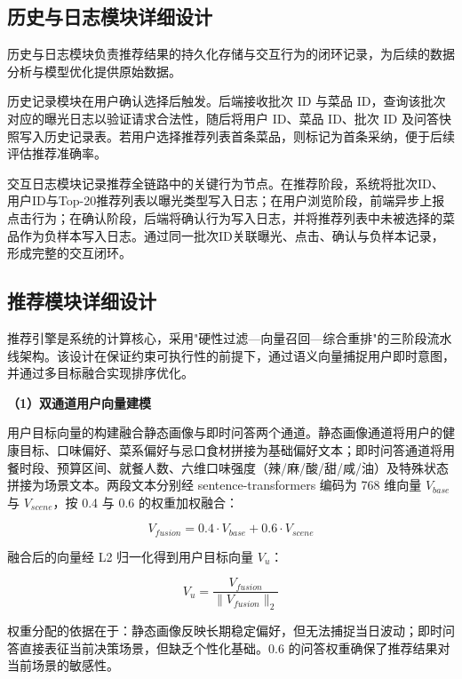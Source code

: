 \subsection{历史与日志模块详细设计}

历史与日志模块负责推荐结果的持久化存储与交互行为的闭环记录，为后续的数据分析与模型优化提供原始数据。

历史记录模块在用户确认选择后触发。后端接收批次 ID 与菜品 ID，查询该批次对应的曝光日志以验证请求合法性，随后将用户 ID、菜品 ID、批次 ID 及问答快照写入历史记录表。若用户选择推荐列表首条菜品，则标记为首条采纳，便于后续评估推荐准确率。

交互日志模块记录推荐全链路中的关键行为节点。在推荐阶段，系统将批次ID、用户ID与Top-20推荐列表以曝光类型写入日志；在用户浏览阶段，前端异步上报点击行为；在确认阶段，后端将确认行为写入日志，并将推荐列表中未被选择的菜品作为负样本写入日志。通过同一批次ID关联曝光、点击、确认与负样本记录，形成完整的交互闭环。

\subsection{推荐模块详细设计}

推荐引擎是系统的计算核心，采用"硬性过滤---向量召回---综合重排"的三阶段流水线架构。该设计在保证约束可执行性的前提下，通过语义向量捕捉用户即时意图，并通过多目标融合实现排序优化。

\textbf{（1）双通道用户向量建模}

用户目标向量的构建融合静态画像与即时问答两个通道。静态画像通道将用户的健康目标、口味偏好、菜系偏好与忌口食材拼接为基础偏好文本；即时问答通道将用餐时段、预算区间、就餐人数、六维口味强度（辣/麻/酸/甜/咸/油）及特殊状态拼接为场景文本。两段文本分别经 sentence-transformers 编码为 768 维向量 $V_{base}$ 与 $V_{scene}$，按 0.4 与 0.6 的权重加权融合：

\begin{equation}
V_{fusion} = 0.4 \cdot V_{base} + 0.6 \cdot V_{scene}
\end{equation}

融合后的向量经 L2 归一化得到用户目标向量 $V_u$：

\begin{equation}
V_u = \frac{V_{fusion}}{\|V_{fusion}\|_2}
\end{equation}

权重分配的依据在于：静态画像反映长期稳定偏好，但无法捕捉当日波动；即时问答直接表征当前决策场景，但缺乏个性化基础。0.6 的问答权重确保了推荐结果对当前场景的敏感性。

